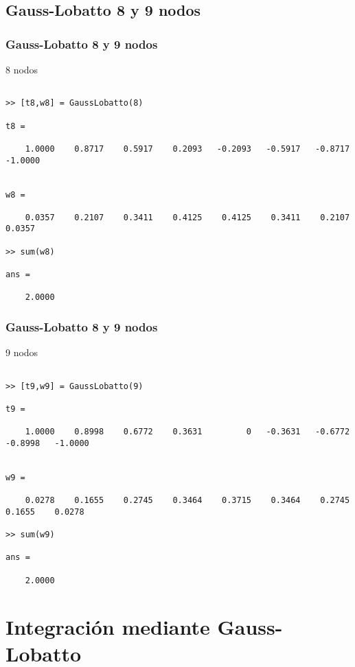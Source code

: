 \documentclass{beamer}
\begin{document}
\subsection{Gauss-Lobatto 8 y 9 nodos}
\begin{frame}
\frametitle{Gauss-Lobatto 8 y 9 nodos}
\begin{block}{8 nodos}
\begin{verbatim}

>> [t8,w8] = GaussLobatto(8)

t8 =

    1.0000    0.8717    0.5917    0.2093   -0.2093   -0.5917   -0.8717   -1.0000


w8 =

    0.0357    0.2107    0.3411    0.4125    0.4125    0.3411    0.2107    0.0357
    
>> sum(w8)

ans =

    2.0000
\end{verbatim}
\end{block}
\end{frame}

\begin{frame}
\frametitle{Gauss-Lobatto 8 y 9 nodos}
\begin{block}{9 nodos}
\begin{verbatim}

>> [t9,w9] = GaussLobatto(9)

t9 =

    1.0000    0.8998    0.6772    0.3631         0   -0.3631   -0.6772   -0.8998   -1.0000


w9 =

    0.0278    0.1655    0.2745    0.3464    0.3715    0.3464    0.2745    0.1655    0.0278

>> sum(w9)

ans =

    2.0000
\end{verbatim}
\end{block}
\end{frame}




\section{Integración mediante Gauss-Lobatto}
\end{document}
